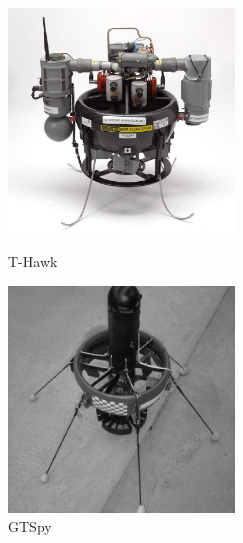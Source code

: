 \begin{figure}[htbp]
	\centering
	\begin{minipage}[c]{0.5\textwidth}
		\centering
		\includegraphics[width=6cm,height=6cm]{Fig/honeywell_t-hawk.jpg}
		\caption{\label{Hawk}T-Hawk}
	\end{minipage}%
	\begin{minipage}[c]{0.5\textwidth}
		\centering
		\includegraphics[width=6cm,height=6cm]{Fig/GTSpy.jpg}
		\caption{\label{GTSpy}GTSpy}
	\end{minipage}
\end{figure}
